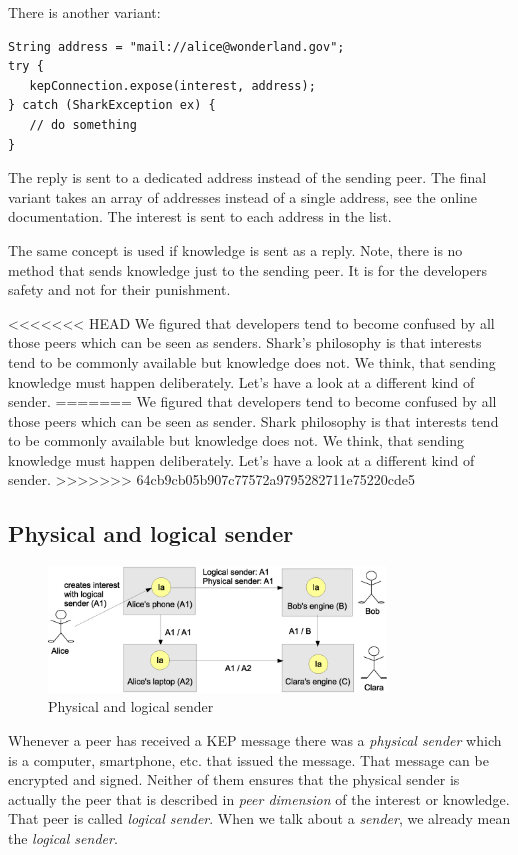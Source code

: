 There is another variant:

\begin{verbatim}
String address = "mail://alice@wonderland.gov";
try {
   kepConnection.expose(interest, address);
} catch (SharkException ex) {
   // do something
}
\end{verbatim}

The reply is sent to a dedicated address instead of the sending peer. The final variant takes an array of addresses instead of a single address, see the online documentation. The interest is sent to each address in the list.

The same concept is used if knowledge is sent as a reply. Note, there is no method that sends knowledge just to the sending peer. It is for the developers safety and not for their punishment.

<<<<<<< HEAD
We figured that developers tend to become confused by all those peers which can be seen as senders. Shark's philosophy is that interests tend to be commonly available but knowledge does not. We think, that sending knowledge must happen deliberately. Let's have a look at a different kind of sender.
=======
We figured that developers tend to become confused by all those peers which can be seen as sender. Shark philosophy is that interests tend to be commonly available but knowledge does not. We think, that sending knowledge must happen deliberately. Let's have a look at a different kind of sender.
>>>>>>> 64cb9cb05b907c77572a9795282711e75220cde5

\subsection{Physical and logical sender}
\label{sec:knowledgePorts:sender}

\begin{figure}[t]
\centering
\includegraphics[width=0.80\textwidth]{physicalAndLogicalSender.eps}
\caption{Physical and logical sender}
\label{fig:physicalAndLogicalSender}
\end{figure}

Whenever a peer has received a KEP message there was a {\it physical sender} which is a computer, smartphone, etc. that issued the message. That message can be encrypted and signed. Neither of them ensures that the physical sender is actually the peer that is described in {\it peer dimension} of the interest or knowledge. That peer is called {\it logical sender}. When we talk about a {\it sender}, we already mean the {\it logical sender}.

